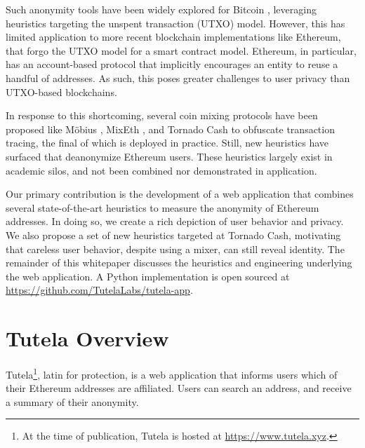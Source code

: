 \documentclass[11pt,a4paper]{article}
\begin{document}
Such anonymity tools have been widely explored for Bitcoin \cite{haslhofer2016bitcoin,kappos2018empirical}, leveraging heuristics targeting the unspent transaction (UTXO) model. However, this has limited application to more recent blockchain implementations like Ethereum, that forgo the UTXO model for a smart contract model.
Ethereum, in particular, has an account-based protocol that implicitly encourages an entity to reuse a handful of addresses.
As such, this poses greater challenges to user privacy than UTXO-based blockchains.

In response to this shortcoming, several coin mixing protocols have been proposed like M\"{o}bius \citep{meiklejohn2018mobius}, MixEth \citep{seres2019mixeth}, and Tornado Cash \citep{pertsev2019tornado} to obfuscate transaction tracing, the final of which is deployed in practice.
Still, new heuristics have surfaced \citep{victor2020address,beres2021blockchain} that deanonymize Ethereum users. These heuristics largely exist in academic silos, and not been combined nor demonstrated in application.

Our primary contribution is the development of a web application that combines several state-of-the-art heuristics to measure the anonymity of Ethereum addresses. In doing so, we create a rich depiction of user behavior and privacy.
We also propose a set of new heuristics targeted at Tornado Cash, motivating that careless user behavior, despite using a mixer, can still reveal identity. The remainder of this whitepaper discusses the heuristics and engineering underlying the web application. A Python implementation is open sourced at \url{https://github.com/TutelaLabs/tutela-app}.

\section{Tutela Overview}

Tutela\footnote{At the time of publication, Tutela is hosted at \url{https://www.tutela.xyz}.}, latin for protection, is a web application that informs users which of their Ethereum addresses are affiliated. Users can search an address, and receive a summary of their anonymity.
\end{document}
